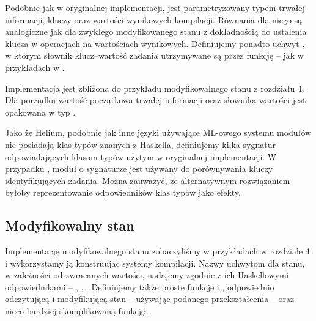 Podobnie jak  w oryginalnej implementacji,  jest parametryzowany typem trwałej informacji, kluczy oraz wartości wynikowych kompilacji. Równania dla niego są analogiczne jak dla zwykłego modyfikowanego stanu z dokładnością do ustalenia klucza w operacjach na wartościach wynikowych. Definiujemy ponadto uchwyt , w którym słownik klucz--wartość zadania utrzymywane są przez funkcję -- jak w przykładach w \BSaLC{}.



Implementacja jest zbliżona do przykładu modyfikowalnego stanu z rozdziału 4. Dla porządku wartość początkowa trwałej informacji oraz słownika wartości jest opakowana w typ .

Jako że Helium, podobnie jak inne języki używające ML-owego systemu modułów nie posiadają klas typów znanych z Haskella, definiujemy kilka sygnatur odpowiadających klasom typów użytym w oryginalnej implementacji. W przypadku , moduł o sygnaturze  jest używany do porównywania kluczy identyfikujących zadania. Można zauważyć, że alternatywnym rozwiązaniem byłoby reprezentowanie odpowiedników klas typów jako efekty.

\begin{minipage}[t]{.45\textwidth}

  

\end{minipage}\hfill
\begin{minipage}[t]{.45\textwidth}

  

\end{minipage}

\subsection{Modyfikowalny stan}

Implementację modyfikowalnego stanu zobaczyliśmy w przykładach w rozdziale 4 i wykorzystamy ją konstruując systemy kompilacji. Nazwy uchwytom dla stanu, w zależności od zwracanych wartości, nadajemy zgodnie z ich Haskellowymi odpowiednikami -- , , . Definiujemy także proste funkcje  i , odpowiednio odczytującą i modyfikującą stan -- używając podanego przekształcenia -- oraz nieco bardziej skomplikowaną funkcję .

